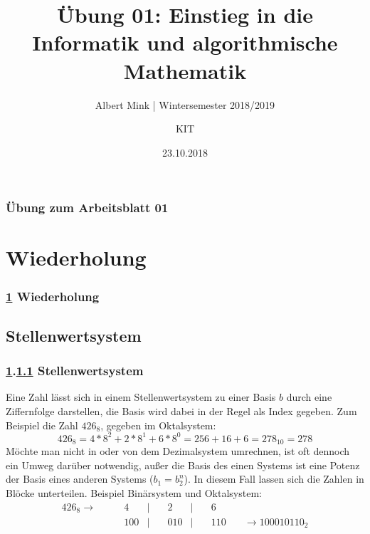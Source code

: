 \documentclass[c,18pt]{beamer}
\date{23.10.2018}
\title[Übung 01: Einstieg in die Informatik und algorithmische]
  {Übung 01: Einstieg in die Informatik und algorithmische \\ Mathematik}
\subtitle{Albert Mink | Wintersemester 2018/2019}
\author[Albert Mink, ]{KIT}
\institute[Institut für Angewandte und Numerische Mathematik (IANM)]{Institut für Angewandte und Numerische Mathematik}
\begin{document}
\begin{frame}
  \maketitle
\end{frame}

\begin{frame}
  \frametitle{Übung zum Arbeitsblatt 01}%
\tableofcontents[hideallsubsections]
\end{frame}

\section{Wiederholung}\label{K:wdh}
\begin{frame}
  \frametitle{\ref{K:wdh} Wiederholung}%
\tableofcontents[current]
\end{frame}


\def\stitle{Stellenwertsystem}
\subsection{\stitle}\label{S:Stellenwertsystem}
\begin{frame}[fragile]%
  \frametitle{\ref{K:wdh}.\ref{S:Stellenwertsystem} \stitle}%

Eine Zahl l\"asst sich in einem Stellenwertsystem zu einer Basis $b$ durch eine Ziffernfolge darstellen, die Basis wird dabei in der Regel als Index gegeben.
Zum Beispiel die Zahl $426_8$, gegeben im Oktalsystem:
\begin{equation*}
426_8 = 4*8^2 + 2*8^1 + 6*8^0 = 256 + 16 + 6 = 278_{10} = 278
\end{equation*}
M\"ochte man nicht in oder von dem Dezimalsystem umrechnen, ist oft dennoch ein Umweg dar\"uber notwendig, au\ss er die Basis des einen Systems ist eine Potenz der Basis eines anderen Systems ($b_1 = b_2^n$).
In diesem Fall lassen sich die Zahlen in Bl\"ocke unterteilen.
Beispiel Bin\"arsystem und Oktalsystem:
\begin{align*}
426_8 \rightarrow \quad & \quad   4 & | & \quad   2 & | & \quad   6 & \\
                        & \quad 100 & | & \quad 010 & | & \quad 110 & \quad \rightarrow 100010110_2
\end{align*}

\end{frame}
\end{document}
